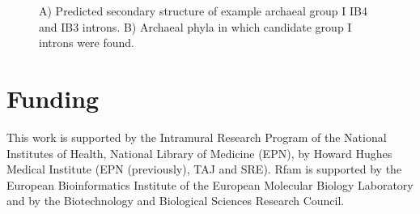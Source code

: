 \documentclass[custom,landscape,final,30pt,plainboxedsections]{sciposter-titleskipsmall}
\begin{document}
\begin{multicols}{3}
\begin{footnotesize}
\begin{figure}
\caption{A) Predicted secondary structure of example archaeal group I
  IB4 and IB3 introns. B) Archaeal phyla in which candidate group I
  introns were found.}
\label{fig:gp1}
\end{figure}
\end{footnotesize}

\section*{Funding}
\begin{footnotesize}
This work is supported by the Intramural Research Program of the
National Institutes of Health, National Library of Medicine (EPN), 
by Howard Hughes Medical Institute (EPN (previously), TAJ and
SRE). Rfam is supported by the European
Bioinformatics Institute of the European Molecular Biology Laboratory
and by the Biotechnology and Biological Sciences Research Council.
\end{footnotesize}


\begin{tiny}

\end{tiny}

\end{multicols}
\end{document}
